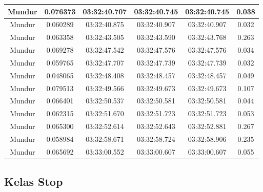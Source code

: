 \begin{longtable}{|c|c|c|c|c|c|}
      Mundur & 0.076373 & 03:32:40.707 & 03:32:40.745 & 03:32:40.745 & 0.038 \\ \hline
      Mundur & 0.060289 & 03:32:40.875 & 03:32:40.907 & 03:32:40.907 & 0.032 \\ \hline
      Mundur & 0.063358 & 03:32:43.505 & 03:32:43.590 & 03:32:43.768 & 0.263 \\ \hline
      Mundur & 0.069278 & 03:32:47.542 & 03:32:47.576 & 03:32:47.576 & 0.034 \\ \hline
      Mundur & 0.059765 & 03:32:47.707 & 03:32:47.739  & 03:32:47.739  & 0.032 \\ \hline
      Mundur & 0.048065 & 03:32:48.408 & 03:32:48.457 & 03:32:48.457 & 0.049 \\ \hline
      Mundur & 0.079513 & 03:32:49.566 & 03:32:49.673 & 03:32:49.673 & 0.107 \\ \hline
      Mundur & 0.066401 & 03:32:50.537 & 03:32:50.581 & 03:32:50.581 & 0.044 \\ \hline
      Mundur & 0.062315 & 03:32:51.670 & 03:32:51.723 & 03:32:51.723 & 0.053 \\ \hline
      Mundur & 0.065300 & 03:32:52.614 & 03:32:52.643 & 03:32:52.881 & 0.267 \\ \hline
      Mundur & 0.058984 & 03:32:58.671 & 03:32:58.724  & 03:32:58.906 & 0.235 \\ \hline
      Mundur & 0.065692 & 03:33:00.552 & 03:33:00.607 & 03:33:00.607 & 0.055 \\ \hline
\end{longtable}

\subsection{Kelas Stop}

